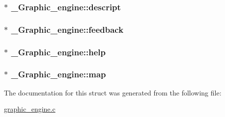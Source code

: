 \subsubsection[{\texorpdfstring{descript}{descript}}]{$\ast$ \+\_\+\+Graphic\+\_\+engine\+::descript}\hypertarget{struct__Graphic__engine_a414bb888ecce3389c7ce348264758e58}{}\label{struct__Graphic__engine_a414bb888ecce3389c7ce348264758e58}
\subsubsection[{\texorpdfstring{feedback}{feedback}}]{$\ast$ \+\_\+\+Graphic\+\_\+engine\+::feedback}\hypertarget{struct__Graphic__engine_a4fc0ef353d000b20d57fb75d898c6d2d}{}\label{struct__Graphic__engine_a4fc0ef353d000b20d57fb75d898c6d2d}
\subsubsection[{\texorpdfstring{help}{help}}]{$\ast$ \+\_\+\+Graphic\+\_\+engine\+::help}\hypertarget{struct__Graphic__engine_ade1d3e95ad6def427f613a4a2d101875}{}\label{struct__Graphic__engine_ade1d3e95ad6def427f613a4a2d101875}
\subsubsection[{\texorpdfstring{map}{map}}]{$\ast$ \+\_\+\+Graphic\+\_\+engine\+::map}\hypertarget{struct__Graphic__engine_a1ea06bb881d335da8c31d63b3e834bdb}{}\label{struct__Graphic__engine_a1ea06bb881d335da8c31d63b3e834bdb}


The documentation for this struct was generated from the following file\+:\begin{DoxyCompactItemize}
\item 
\hyperlink{graphic__engine_8c}{graphic\+\_\+engine.\+c}\end{DoxyCompactItemize}
